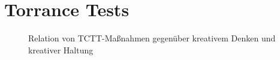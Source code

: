 \section{Torrance Tests}{
	\label{sec:torrance_tests}
	\begin{figure}[htbp!]
		\centering
		\caption[Relation von TTCT-Maßnahmen]{Relation von TCTT-Maßnahmen gegenüber kreativem Denken und kreativer Haltung \cite{Kim2016}}
		\label{img:ttct}
	\end{figure}
}
